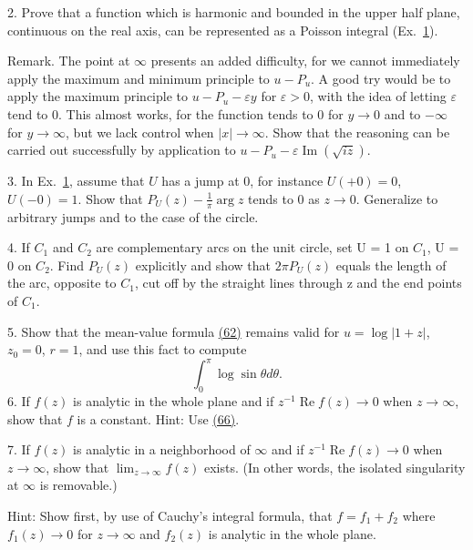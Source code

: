2. Prove that a function which is harmonic and bounded in the upper half plane, continuous on the real axis, can be represented as a Poisson integral (Ex.~\hyperref[exercise:4.6.4.12.1]{1}).

Remark. The point at $\infty$ presents an added difficulty, for we cannot immediately apply the maximum and minimum principle to $u - P_u$. A good try would be to apply the maximum principle to $u - P_u - \varepsilon y$ for $\varepsilon > 0$, with the idea of letting $\varepsilon$ tend to 0. This almost works, for the function tends to 0 for $y \to 0$ and to $-\infty$ for $y \to \infty$, but we lack control when $|x| \to \infty$. Show that the reasoning can be carried out successfully by application to $u - P_u - \varepsilon\operatorname{Im}(\sqrt{iz})$.

3. In Ex.~\hyperref[exercise:4.6.4.12.1]{1}, assume that $U$ has a jump at 0, for instance $U(+0) = 0$, $U(-0) = 1$. Show that $P_U(z) - \frac{1}{\pi} \arg z$ tends to 0 as $z \to 0$. Generalize to arbitrary jumps and to the case of the circle.

4. If $C_{1}$ and $C_{2}$ are complementary arcs on the unit circle, set U = 1 on $C_{1}$, U = 0 on $C_{2}$. Find $P_{U}(z)$ explicitly and show that $2\pi P_{U}(z)$ equals the length of the arc, opposite to $C_{1}$, cut off by the straight lines through z and the end points of $C_{1}$.

5. Show that the mean-value formula \hyperref[eq:4.62]{(62)} remains valid for $u = \log |1 + z|$, $z_0 = 0$, $r = 1$, and use this fact to compute
\begin{equation*}
\int_ {0} ^ {\pi} \log \sin \theta d \theta .
\end{equation*}
6. If $f(z)$ is analytic in the whole plane and if $z^{-1} \operatorname{Re} f(z) \to 0$ when $z \to \infty$, show that $f$ is a constant. Hint: Use \hyperref[eq:4.66]{(66)}.

7. If $f(z)$ is analytic in a neighborhood of $\infty$ and if $z^{-1} \operatorname{Re} f(z) \to 0$ when $z \to \infty$, show that $\lim_{z \to \infty} f(z)$ exists. (In other words, the isolated singularity at $\infty$ is removable.)

Hint: Show first, by use of Cauchy's integral formula, that $f = f_{1} + f_{2}$ where $f_{1}(z) \to 0$ for $z \to \infty$ and $f_{2}(z)$ is analytic in the whole plane.


